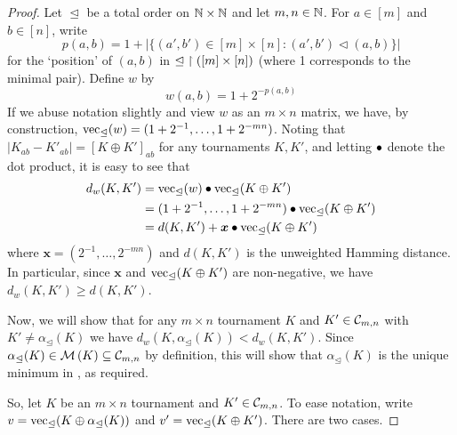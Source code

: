 \begin{proof}

    Let $\trianglelefteq$ be a total order on $\mathbb{N} \times \mathbb{N}$ and let $m, n \in
    \mathbb{N}$. For $a \in [m]$ and $b \in [n]$, write
    \[
        p(a,b)
        =
        1 + |\{(a',b') \in [m] \times [n] : (a',b') \vartriangleleft (a,b)\}|
    \]
    for the `position' of $(a,b)$ in ${\trianglelefteq} \upharpoonright ([m] \times [n])$
    (where 1 corresponds to the minimal pair). Define $w$ by
    \[
        w(a,b) = 1 + 2^{-p(a,b)}
    \]
    If we abuse notation slightly and view $w$ as an $m \times n$ matrix, we
    have, by construction, $\operatorname{vec}_{\trianglelefteq}(w) = (1 +
    2^{-1},\ldots,1 + 2^{-mn})$. Noting that $|K_{ab} - K'_{ab}| = [K \oplus
    K']_{ab}$ for any tournaments $K, K'$, and letting $\bullet$ denote the
    dot product, it is easy to see that
    \begin{align*}
        d_w(K, K')
        &= \operatorname{vec}_{\trianglelefteq}(w)
            \bullet \operatorname{vec}_{\trianglelefteq}(K \oplus K') \\
        &= (1 + 2^{-1},\ldots,1 + 2^{-mn})
           \bullet
           \operatorname{vec}_{\trianglelefteq}(K \oplus K') \\
        &= d(K, K') + \bm{x} \bullet \operatorname{vec}_{\trianglelefteq}(K \oplus K')
    \end{align*}
    where $\bm{x} = (2^{-1},\ldots,2^{-mn})$ and $d(K, K')$ is the
    unweighted Hamming distance. In particular, since $\bm{x}$ and
    $\operatorname{vec}_{\trianglelefteq}(K \oplus K')$ are non-negative, we have $d_w(K, K')
    \ge d(K, K')$.

    Now, we will show that for any $m \times n$ tournament $K$ and $K' \in
    \mathcal{C}_{m,n}$ with $K' \ne \alpha_{\trianglelefteq}(K)$ we have $d_w(K,
    \alpha_{\trianglelefteq}(K)) < d_w(K, K')$. Since
    $\alpha_{\trianglelefteq}(K) \in \operatorname{\mathcal{M}}\left({K}\right) \subseteq \mathcal{C}_{m,n}$ by
    definition, this will show that $\alpha_{\trianglelefteq}(K)$ is the
    unique minimum in , as required.

    So, let $K$ be an $m \times n$ tournament and $K' \in \mathcal{C}_{m,n}$. To ease
    notation, write $v = \operatorname{vec}_{\trianglelefteq}(K \oplus
    \alpha_{\trianglelefteq}(K))$ and $v' = \operatorname{vec}_{\trianglelefteq}(K \oplus K')$.
    There are two cases.


\end{proof}
